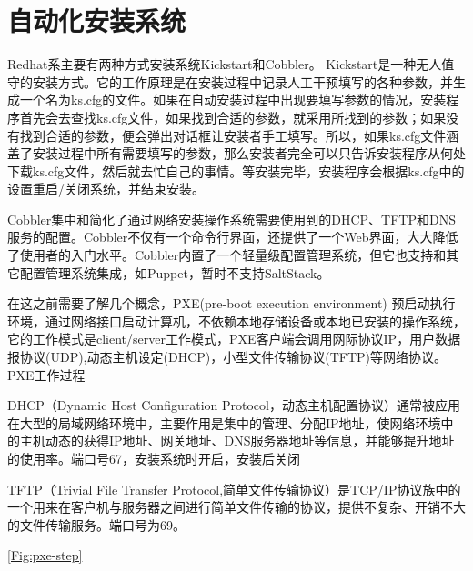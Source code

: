 \chapter{自动化安装系统}


Redhat系主要有两种方式安装系统Kickstart和Cobbler。
Kickstart是一种无人值守的安装方式。它的工作原理是在安装过程中记录人工干预填写的各种参数，并生成一个名为ks.cfg的文件。如果在自动安装过程中出现要填写参数的情况，安装程序首先会去查找ks.cfg文件，如果找到合适的参数，就采用所找到的参数；如果没有找到合适的参数，便会弹出对话框让安装者手工填写。所以，如果ks.cfg文件涵盖了安装过程中所有需要填写的参数，那么安装者完全可以只告诉安装程序从何处下载ks.cfg文件，然后就去忙自己的事情。等安装完毕，安装程序会根据ks.cfg中的设置重启/关闭系统，并结束安装。

Cobbler集中和简化了通过网络安装操作系统需要使用到的DHCP、TFTP和DNS服务的配置。Cobbler不仅有一个命令行界面，还提供了一个Web界面，大大降低了使用者的入门水平。Cobbler内置了一个轻量级配置管理系统，但它也支持和其它配置管理系统集成，如Puppet，暂时不支持SaltStack。

在这之前需要了解几个概念，PXE(pre-boot execution environment) 预启动执行环境，通过网络接口启动计算机，不依赖本地存储设备或本地已安装的操作系统，它的工作模式是client/server工作模式，PXE客户端会调用网际协议IP，用户数据报协议(UDP),动态主机设定(DHCP)，小型文件传输协议(TFTP)等网络协议。
PXE工作过程

DHCP（Dynamic Host Configuration Protocol，动态主机配置协议）通常被应用在大型的局域网络环境中，主要作用是集中的管理、分配IP地址，使网络环境中的主机动态的获得IP地址、网关地址、DNS服务器地址等信息，并能够提升地址的使用率。端口号67，安装系统时开启，安装后关闭

 TFTP（Trivial File Transfer Protocol,简单文件传输协议）是TCP/IP协议族中的一个用来在客户机与服务器之间进行简单文件传输的协议，提供不复杂、开销不大的文件传输服务。端口号为69。

\ref{Fig:pxe-step}

